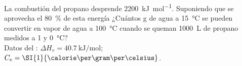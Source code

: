 La combustión del propano desprende \SI{2200}{\kilo\joule\per\mol}. Suponiendo que se aprovecha el \SI{80}{\percent} de esta energía ¿Cuántos \si{\gram} de agua a \SI{15}{\celsius} se pueden convertir en vapor de agua a \SI{100}{\celsius} cuando se queman \SI{1000}{\liter} de propano medidos a \SI{1}{\atm} y \SI{0}{\celsius}?\\
Datos del : $\Delta H_v= \SI{40,7}{\kilo\joule\per\mol}$; $C_e = \SI{1}{\calorie\per\gram\per\celsius}$.
